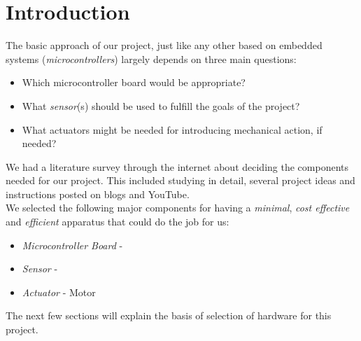 \chapter{Introduction}\label{ch:introduction}
The basic approach of our project, just like any other based on embedded systems (\textit{microcontrollers}) largely depends on three main questions: 
\begin{itemize}
	\item Which microcontroller board would be appropriate?
	\item What \textit{sensor}(s) should be used to fulfill the goals of the project? 
	\item What actuators might be needed for introducing mechanical action, if needed? 
 
\end{itemize}

We had a literature survey through the internet about deciding the components needed for our project. This included studying in detail, several project ideas and instructions posted on blogs and YouTube.\\
We selected the following major components for having a \textsl{minimal}, \textsl{cost effective} and \textsl{efficient} apparatus that could do the job for us:
\begin{itemize}
	\item \textit{Microcontroller Board} - \arduinouno{}
	\item \textit{Sensor} - \hcsr{} \ultrasonic{}
	\item \textit{Actuator} - \servo{} Motor

\end{itemize}
The next few sections will explain the basis of selection of hardware for this project.

\clearpage

